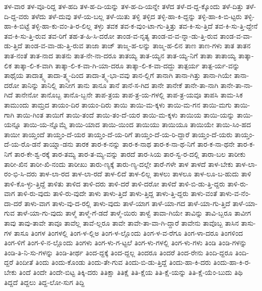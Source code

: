 {ತಳ-ವಾರ
ತಳ-ವೂ-ರಿದ್ದ
ತಳ-ಹದಿ
ತಳ-ಹ-ದಿ-ಯನ್ನು
ತಳ-ಹ-ದಿ-ಯನ್ನೇ
ತಳೆದ
ತಳೆ-ದ-ದ್ದ-ಕ್ಕೊಂದು
ತಳೆ-ದಿತ್ತು
ತಳೆ-ದಿ-ದ್ದ-ವರು
ತಳೆದು
ತಳೆ-ದುವು
ತಳೆ-ಯ-ಬಲ್ಲ
ತಳೆ-ಯಿತು
ತಳ್ಳಿ
ತಳ್ಳಿದ
ತಳ್ಳಿ-ಹಾ-ಕಿ-ದ್ದನ್ನು
ತಳ್ಳಿ-ಹಾ-ಕಿ-ಬಿ-ಟ್ಟರು
ತಳ್ಳಿ-ಹಾ-ಕಿ-ಬಿಟ್ಟೆ
ತಳ್ಳಿ-ಹಾ-ಕು-ವಂ-ತಿ-ರ-ಲಿಲ್ಲ
ತಳ್ಳು
ತವಕ
ತವ-ಕ-ವುಂ-ಟಾ-ಗು-ತ್ತಿತ್ತು
ತವ-ಕಿ-ಸು-ತ್ತಿದೆ
ತವ-ಕಿ-ಸು-ತ್ತಿ-ದ್ದೇನೆ
ತವ-ಕಿ-ಸು-ತ್ತಿ-ರುವ
ತವ-ರಿಗೆ
ತಹ-ತ-ಹಿ-ಸಿ-ದರೋ
ತಾಂಡ-ವ-ನೃತ್ಯ
ತಾಂಡ-ವ-ವ-ನ್ನಾ-ಡು-ತ್ತಿ-ರುವ
ತಾಂಡ-ವ-ವಾ-ಡು-ತ್ತಿದೆ
ತಾಂಡ-ವ-ವಾ-ಡು-ತ್ತಿ-ರುವ
ತಾಜಾ
ತಾಜ್
ತಾಜ್ಮ-ಹ-ಲನ್ನು
ತಾಜ್ಮ-ಹ-ಲಿನ
ತಾಣ
ತಾಣ-ಗಳು
ತಾತ
ತಾತನ
ತಾತ-ನಂತೆ
ತಾತ-ನಾದ
ತಾತನು
ತಾತ-ನೇ-ನಾ-ದರೂ
ತಾತಯ್ಯ
ತಾತ-ಯ್ಯನ
ತಾತ-ಯ್ಯ-ನಿಗೆ
ತಾತಾ
ತಾತಾಯ್ಯ
ತಾತ್ಕಾ-ಲಿಕ
ತಾತ್ಕಾ-ಲಿ-ಕ-ವಾಗಿ
ತಾತ್ಕಾ-ಲಿ-ಕ-ವಾ-ಗಿ-ಯಾ-ದರೂ
ತಾತ್ಕಾ-ಲಿ-ಕ-ವಾ-ದದ್ದು
ತಾತ್ಪರ್ಯ
ತಾತ್ಪ-ರ್ಯ-ವನ್ನು
ತಾಥೈಯ
ತಾದಾತ್ಮ್ಯ
ತಾದಾ-ತ್ಮ್ಯ-ದಿಂದ
ತಾದಾ-ತ್ಮ್ಯ-ಭಾ-ವವು
ತಾನ-ಲ್ಲಿಗೆ
ತಾನಾಗಿ
ತಾನಾ-ಗಿತ್ತು
ತಾನಾ-ಗಿಯೇ
ತಾನಾ-ದರೋ
ತಾನಿನ್ನು
ತಾನಿಲ್ಲಿ
ತಾನೀಗ
ತಾನು
ತಾನೂ
ತಾನೆ
ತಾನೆ-ಸ-ಗಿದ
ತಾನೇ
ತಾನೇಕೆ
ತಾನೇ-ತಾ-ನಾಗಿ
ತಾನೇ-ತಾ-ನಾ-ಗಿದೆ
ತಾನೇನೋ
ತಾನೊಬ್ಬ
ತಾನೊ-ಬ್ಬನೇ
ತಾಪ-ತ್ರಯ
ತಾಪ-ತ್ರ-ಯ-ಗಳಲ್ಲಿ
ತಾಪ-ತ್ರ-ಯವೂ
ತಾಪಸಿ
ತಾಮ-ಸಿಕ
ತಾಮುಂದು
ತಾಮ್ರದ
ತಾಯಂ-ದಿರ
ತಾಯಂ-ದಿರು
ತಾಯಿ
ತಾಯಿ-ಮ-ಕ್ಕಳು
ತಾಯಿ-ಮ-ಗನ
ತಾಯಿ-ಮಗು
ತಾಯಿ-ಗಾಗಿ
ತಾಯಿ-ಗಿಂತ
ತಾಯಿಗೆ
ತಾಯಿ-ತಂದೆ
ತಾಯಿ-ತಂ-ದೆ-ಯರ
ತಾಯಿ-ಮ-ಕ್ಕಳು
ತಾಯಿಯ
ತಾಯಿ-ಯನ್ನು
ತಾಯಿ-ಯನ್ನೂ
ತಾಯಿ-ಯ-ನ್ನೊಮ್ಮೆ
ತಾಯಿ-ಯಾದ
ತಾಯಿ-ಯಿಂದ
ತಾಯಿಯು
ತಾಯಿಯೂ
ತಾಯಿಯೇ
ತಾಯಿ-ಸಿಂ-ಹದ
ತಾಯೀ
ತಾಯ್ತಂದೆ
ತಾಯ್ತಂ-ದೆ-ಯರ
ತಾಯ್ತಂ-ದೆ-ಯ-ರಿಗೆ
ತಾಯ್ತಂ-ದೆ-ಯ-ರಿ-ದ್ದಾರೆ
ತಾಯ್ತಂ-ದೆ-ಯರು
ತಾಯ್ತಂ-ದೆ-ಯ-ರೊ-ಡನೆ
ತಾಯ್ನಾ-ಡನು
ತಾರಕ
ತಾರ-ಕ-ನನ್ನು
ತಾರ-ಕ-ನಾಥ
ತಾರ-ಕ-ನಾ-ಥ-ನಿಗೆ
ತಾರ-ಕ-ನಾ-ಥನೇ
ತಾರ-ಕ-ನಿಗೆ
ತಾರ-ಕೇ-ಶ್ವ-ರಕ್ಕೆ
ತಾರ-ತಮ್ಯ
ತಾರ-ತ-ಮ್ಯ-ವನ್ನು
ತಾರದೆ
ತಾರ-ಸಿಯ
ತಾರ-ಸ್ವ-ರ-ದಲ್ಲಿ
ತಾರಾ-ಬಲ
ತಾರೀಕು
ತಾರೀ-ಖಿನ
ತಾರೀ-ಖಿ-ನಂದು
ತಾರೀಖು
ತಾರು-ಣ್ಯಕ್ಕೆ
ತಾರು-ಣ್ಯ-ದಲ್ಲೇ
ತಾರೆ-ಗಳೇ
ತಾಳ
ತಾಳದೆ
ತಾಳ-ಬೇಕು
ತಾಳ-ಲಾ-ರಂ-ಭಿ-ಸಿ-ದರು
ತಾಳ-ಲಾ-ರದ
ತಾಳ-ಲಾ-ರದೆ
ತಾಳ-ಲಿದೆ
ತಾಳ-ಲಿಲ್ಲ
ತಾಳಲು
ತಾಳಲೂ
ತಾಳ-ಲೂ-ಬ-ಹುದು
ತಾಳಿ
ತಾಳಿ-ಕೊ-ಳ್ಳು-ತ್ತಿದ್ದೆ
ತಾಳಿತು
ತಾಳಿದ
ತಾಳಿ-ದರು
ತಾಳಿ-ದರೆ
ತಾಳಿ-ದರೋ
ತಾಳಿದೆ
ತಾಳಿ-ಬಿ-ಡು-ತ್ತಿ-ದ್ದರು
ತಾಳಿ-ರು-ವಾಗ
ತಾಳಿ-ರು-ವುದು
ತಾಳಿ-ರು-ವುದೇ
ತಾಳು
ತಾಳು-ತ್ತಿದೆ
ತಾಳು-ತ್ತಿದ್ದ
ತಾಳು-ತ್ತಿ-ದ್ದರು
ತಾಳು-ವಂತೆ
ತಾಳು-ವ-ನೆಂ-ದಾ-ದರೆ
ತಾಳು-ವಾಗ
ತಾಳು-ವು-ದ-ರಲ್ಲಿ
ತಾಳು-ವುದು
ತಾಳೆ-ಯಾಗ
ತಾಳೆ-ಯಾ-ಗದ
ತಾಳೆ-ಯಾ-ಗು-ತ್ತಿದೆ
ತಾಳೆ-ಯಾ-ಗುವ
ತಾಳೆ-ಯಾ-ಗು-ವುದು
ತಾಳ್ಮೆ
ತಾಳ್ಮೆ-ಗೆ-ಡದೆ
ತಾಳ್ಮೆ-ಯಿರು
ತಾಳ್ವೆ
ತಾವಾ-ಗಿಯೇ
ತಾವಿನ್ನು
ತಾವಿ-ಬ್ಬರೂ
ತಾವೀಗ
ತಾವು
ತಾವು-ತಾವೇ
ತಾವೂ
ತಾವೆಲ್ಲ
ತಾವೆ-ಲ್ಲರೂ
ತಾವೇ
ತಾವೇ-ತಾ-ವಾ-ಗಿ-ದ್ದಾರೆ
ತಾವೇನು
ತಾವೊಬ್ಬ
ತಾಸಿನ
ತಾಸು-ಗಳ
ತಾಸೂ
ತಿಂಗಳ
ತಿಂಗಳಲ್ಲಿ
ತಿಂಗ-ಳ-ಲ್ಲಿಅ
ತಿಂಗ-ಳ-ಲ್ಲೊಂದು
ತಿಂಗ-ಳ-ವ-ರೆಗೂ
ತಿಂಗ-ಳಾ-ದರೂ
ತಿಂಗಳಿಂದ
ತಿಂಗ-ಳಿಗೆ
ತಿಂಗ-ಳಿ-ನ-ಲ್ಲೊಂದು
ತಿಂಗಳು
ತಿಂಗ-ಳು-ಗ-ಟ್ಟಲೆ
ತಿಂಗ-ಳು-ಗಳಲ್ಲಿ
ತಿಂಗ-ಳು-ಗಳು
ತಿಂಡಿ
ತಿಂಡಿ-ಗಳನ್ನು
ತಿಂಡಿ-ತಿ-ನಿ-ಸು-ಗಳನ್ನು
ತಿಂಡಿ-ತೀರ್ಥ
ತಿಂದ-ದ್ದಕ್ಕೆ
ತಿಂದ-ದ್ದಲ್ಲ
ತಿಂದರೂ
ತಿಂದರೆ
ತಿಂದ-ರೇನು
ತಿಂದಿ-ದ್ದರೂ
ತಿಂದಿ-ದ್ದರೆ
ತಿಂದೀತೆ
ತಿಂದು
ತಿಂದು-ಕೊಂಡು
ತಿಂದು-ತೇ-ಗುವ
ತಿಂದು-ಬಿ-ಡು-ತ್ತಿದ್ದೆ
ತಿಂದು-ಹಾ-ಕಿ-ದರು
ತಿಂದು-ಹಾ-ಕಿ-ರ-ಬೇಕು
ತಿಂದೆ
ತಿಂದೇ
ತಿಂದೇ-ಬಿಟ್ಟ
ತಿಕ್ಕಿ-ದರು
ತಿತಿಕ್ಷಾ
ತಿತಿಕ್ಷೆ
ತಿತಿ-ಕ್ಷೆಯ
ತಿತಿ-ಕ್ಷೆ-ಯನ್ನು
ತಿತಿ-ಕ್ಷೆ-ಯೆಂ-ಬುದು
ತಿಥಿ
ತಿದ್ದದೆ
ತಿದ್ದಲು
ತಿದ್ದ-ಲೋ-ಸುಗ
ತಿದ್ದಿ
}
